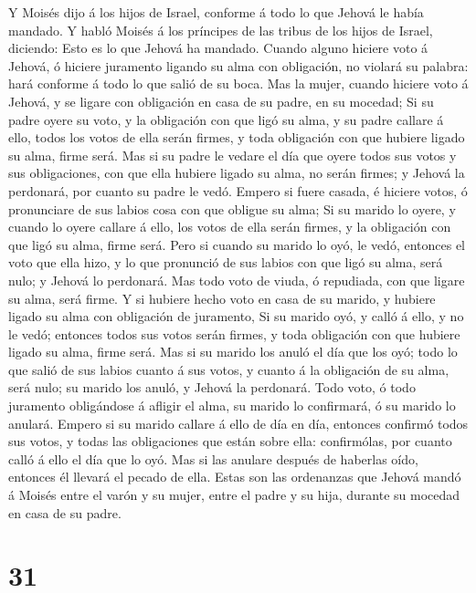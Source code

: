  Y Moisés dijo á los hijos de Israel, conforme á todo lo
que Jehová le había mandado.  Y habló Moisés á los
príncipes de las tribus de los hijos de Israel, diciendo: Esto es lo que
Jehová ha mandado.  Cuando alguno hiciere voto á Jehová, ó
hiciere juramento ligando su alma con obligación, no violará su palabra:
hará conforme á todo lo que salió de su boca.  Mas la
mujer, cuando hiciere voto á Jehová, y se ligare con obligación en casa
de su padre, en su mocedad;  Si su padre oyere su voto, y
la obligación con que ligó su alma, y su padre callare á ello, todos los
votos de ella serán firmes, y toda obligación con que hubiere ligado su
alma, firme será.  Mas si su padre le vedare el día que
oyere todos sus votos y sus obligaciones, con que ella hubiere ligado su
alma, no serán firmes; y Jehová la perdonará, por cuanto su padre le
vedó.  Empero si fuere casada, é hiciere votos, ó
pronunciare de sus labios cosa con que obligue su alma; 
Si su marido lo oyere, y cuando lo oyere callare á ello, los votos de
ella serán firmes, y la obligación con que ligó su alma, firme será.
 Pero si cuando su marido lo oyó, le vedó, entonces el
voto que ella hizo, y lo que pronunció de sus labios con que ligó su
alma, será nulo; y Jehová lo perdonará.  Mas todo voto de
viuda, ó repudiada, con que ligare su alma, será firme. 
Y si hubiere hecho voto en casa de su marido, y hubiere ligado su alma
con obligación de juramento,  Si su marido oyó, y calló á
ello, y no le vedó; entonces todos sus votos serán firmes, y toda
obligación con que hubiere ligado su alma, firme será. 
Mas si su marido los anuló el día que los oyó; todo lo que salió de sus
labios cuanto á sus votos, y cuanto á la obligación de su alma, será
nulo; su marido los anuló, y Jehová la perdonará.  Todo
voto, ó todo juramento obligándose á afligir el alma, su marido lo
confirmará, ó su marido lo anulará.  Empero si su marido
callare á ello de día en día, entonces confirmó todos sus votos, y todas
las obligaciones que están sobre ella: confirmólas, por cuanto calló á
ello el día que lo oyó.  Mas si las anulare después de
haberlas oído, entonces él llevará el pecado de ella. Estas son las
ordenanzas que Jehová mandó á Moisés entre el varón y su mujer, entre el
padre y su hija, durante su mocedad en casa de su padre.

\hypertarget{section-30}{%
\section{31}\label{section-30}}

